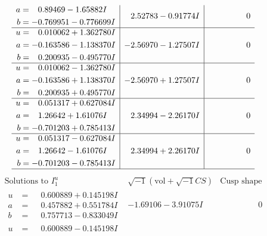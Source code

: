 \documentclass[1p]{elsarticle_modified}
\theoremstyle{definition}
\newcommand{\I}{\sqrt{-1}}
\begin{document}
$$\begin{array}{c|c|c}
\begin{aligned}
a &= \phantom{-}0.89469 - 1.65882 I \\
b &= -0.769951 - 0.776699 I\end{aligned}
 & \phantom{-}2.52783 - 0.91774 I & \phantom{-0.000000 } 0 \\ \hline\begin{aligned}
u &= \phantom{-}0.010062 + 1.362780 I \\
a &= -0.163586 - 1.138370 I \\
b &= \phantom{-}0.200935 - 0.495770 I\end{aligned}
 & -2.56970 - 1.27507 I & \phantom{-0.000000 } 0 \\ \hline\begin{aligned}
u &= \phantom{-}0.010062 - 1.362780 I \\
a &= -0.163586 + 1.138370 I \\
b &= \phantom{-}0.200935 + 0.495770 I\end{aligned}
 & -2.56970 + 1.27507 I & \phantom{-0.000000 } 0 \\ \hline\begin{aligned}
u &= \phantom{-}0.051317 + 0.627084 I \\
a &= \phantom{-}1.26642 + 1.61076 I \\
b &= -0.701203 + 0.785413 I\end{aligned}
 & \phantom{-}2.34994 - 2.26170 I & \phantom{-0.000000 } 0 \\ \hline\begin{aligned}
u &= \phantom{-}0.051317 - 0.627084 I \\
a &= \phantom{-}1.26642 - 1.61076 I \\
b &= -0.701203 - 0.785413 I\end{aligned}
 & \phantom{-}2.34994 + 2.26170 I & \phantom{-0.000000 } 0\\
 \hline 
 \end{array}$$\newpage$$\begin{array}{c|c|c}  
\text{Solutions to }I^u_{1}& \I (\text{vol} + \sqrt{-1}CS) & \text{Cusp shape}\\
 \hline 
\begin{aligned}
u &= \phantom{-}0.600889 + 0.145198 I \\
a &= \phantom{-}0.457882 + 0.551784 I \\
b &= \phantom{-}0.757713 - 0.833049 I\end{aligned}
 & -1.69106 - 3.91075 I & \phantom{-0.000000 } 0 \\ \hline\begin{aligned}
u &= \phantom{-}0.600889 - 0.145198 I \\

\end{aligned}
\end{array}$$
\end{document}
